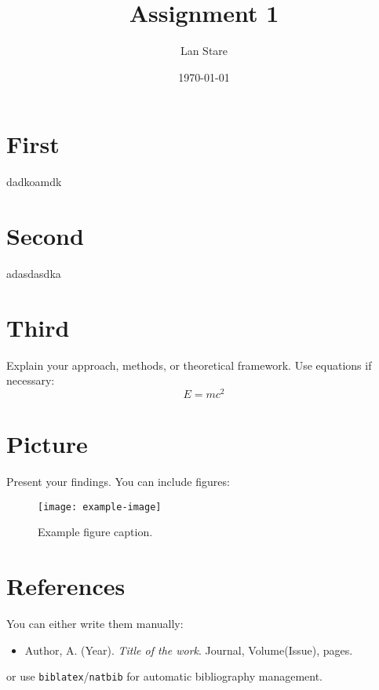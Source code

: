 \documentclass[12pt]{article}
\begin{document}
\title{Assignment 1}
\author{Lan Stare}
\date{\today}

\maketitle

\section{First}
dadkoamdk

\section{Second}
adasdasdka

\section{Third}
Explain your approach, methods, or theoretical framework. Use equations if necessary:
\[
E = mc^2
\]

\section{Picture}
Present your findings. You can include figures:
\begin{figure}[h!]
    \centering
    \texttt{[image: example-image]}
    \caption{Example figure caption.}
    \label{fig:example}
\end{figure}

\section*{References}
You can either write them manually:
\begin{itemize}
    \item Author, A. (Year). \textit{Title of the work}. Journal, Volume(Issue), pages.
\end{itemize}
or use \texttt{biblatex}/\texttt{natbib} for automatic bibliography management.
\end{document}
